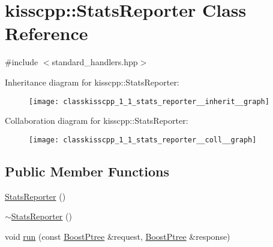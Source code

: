 \hypertarget{classkisscpp_1_1_stats_reporter}{\section{kisscpp\-:\-:Stats\-Reporter Class Reference}
\label{classkisscpp_1_1_stats_reporter}
}


{\ttfamily \#include $<$standard\-\_\-handlers.\-hpp$>$}



Inheritance diagram for kisscpp\-:\-:Stats\-Reporter\-:\nopagebreak
\begin{figure}[H]
\begin{center}
\leavevmode
\texttt{[image: classkisscpp\_1\_1\_stats\_reporter\_\_inherit\_\_graph]}
\end{center}
\end{figure}


Collaboration diagram for kisscpp\-:\-:Stats\-Reporter\-:\nopagebreak
\begin{figure}[H]
\begin{center}
\leavevmode
\texttt{[image: classkisscpp\_1\_1\_stats\_reporter\_\_coll\_\_graph]}
\end{center}
\end{figure}
\subsection*{Public Member Functions}
\begin{DoxyCompactItemize}
\item 
\hyperlink{classkisscpp_1_1_stats_reporter_a07215d1f69aabea8e60a49a930d11401}{Stats\-Reporter} ()
\item 
\hyperlink{classkisscpp_1_1_stats_reporter_a147cf5af12711d7cc5617d6538724e07}{$\sim$\-Stats\-Reporter} ()
\item 
void \hyperlink{classkisscpp_1_1_stats_reporter_af57d8c01b118a4693b8b226c3f9dbbe5}{run} (const \hyperlink{boost__ptree_8hpp_ab36820650b8e0db36402aea80485633c}{Boost\-Ptree} \&request, \hyperlink{boost__ptree_8hpp_ab36820650b8e0db36402aea80485633c}{Boost\-Ptree} \&response)
\end{DoxyCompactItemize}


